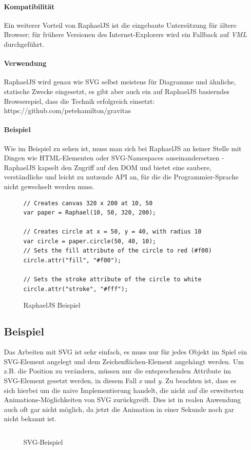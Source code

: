 \documentclass[a4paper, 12pt]{article}
\begin{document}
\paragraph{Kompatibilität} Ein weiterer Vorteil von RaphaelJS ist die eingebaute Untersützung für ältere Browser; für frühere Versionen des Internet-Explorers wird ein Fallback auf \emph{VML} durchgeführt.
\paragraph{Verwendung} RaphaelJS wird genau wie SVG selbst meistens für Diagramme und ähnliche, statische Zwecke eingesetzt, es gibt aber auch ein auf RaphaelJS basierndes Browserspiel, dass die Technik erfolgreich einsetzt: https://github.com/petehamilton/gravitas
\paragraph{Beispiel}
Wie im Beispiel zu sehen ist, muss man sich bei RaphaelJS an keiner Stelle mit Dingen wie HTML-Elementen oder SVG-Namespaces auseinandersetzen - RaphaelJS kapselt den Zugriff auf den DOM und bietet eine saubere, verständliche und leicht zu nutzende API an, für die die Programmier-Sprache nicht gewechselt werden muss. 
\begin{figure}[H]
	\begin{verbatim}
// Creates canvas 320 x 200 at 10, 50
var paper = Raphael(10, 50, 320, 200);

// Creates circle at x = 50, y = 40, with radius 10
var circle = paper.circle(50, 40, 10);
// Sets the fill attribute of the circle to red (#f00)
circle.attr("fill", "#f00");

// Sets the stroke attribute of the circle to white
circle.attr("stroke", "#fff");	
	\end{verbatim}
	\caption{RaphaelJS Beispiel}
	\label{raphaeljs_example}
\end{figure}
\newpage
\subsection{Beispiel}
Das Arbeiten mit SVG ist sehr einfach, es muss nur für jedes Objekt im Spiel ein SVG-Element angelegt und dem Zeichenflächen-Element angehängt werden. Um z.B. die Position zu verändern, müssen nur die entsprechenden Attribute im SVG-Element gesetzt werden, in diesem Fall \emph{x} und \emph{y}. Zu beachten ist, dass es sich hierbei um die naive Implementierung handelt, die nicht auf die erweiterten Animations-Möglichkeiten von SVG zurückgreift. Dies ist in realen Anwendung auch oft gar nicht möglich, da jetzt die Animation in einer Sekunde noch gar nicht bekannt ist.
\begin{figure}[H]
	\inputminted{javascript}{assets/vanillasvg_example.js}
	\caption{SVG-Beispiel}
	\label{svg_example}
\end{figure}
\end{document}
